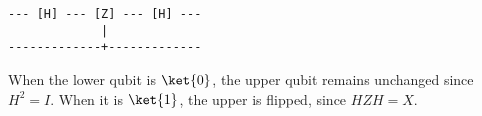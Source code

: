 \begingroup
%
\begin{verbatim}
--- [H] --- [Z] --- [H] ---
             |
-------------+-------------
\end{verbatim}
%
When the lower qubit is $\ket{0}$, the upper qubit remains unchanged since $H^2 = I$.
%
When it is $\ket{1}$, the upper is flipped, since $H Z H = X$.
\endgroup
